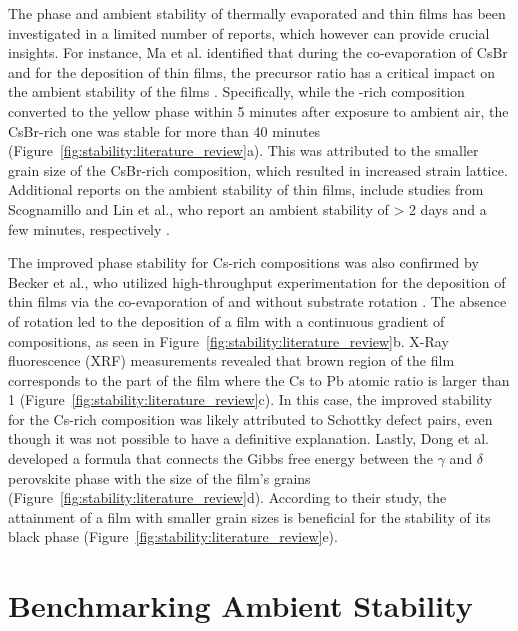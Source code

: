 The phase and ambient stability of thermally evaporated  and  thin films has been investigated in a limited number of reports, which however can provide crucial insights. For instance, Ma et al. identified that during the co-evaporation of CsBr and  for the deposition of  thin films, the precursor ratio has a critical impact on the ambient stability of the films \cite{Ma2017TheCells}. Specifically, while the -rich composition converted to the yellow phase within 5 minutes after exposure to ambient air, the CsBr-rich one was stable for more than 40 minutes (Figure~\ref{fig:stability:literature_review}a). This was attributed to the smaller grain size of the CsBr-rich composition, which resulted in increased strain lattice. Additional reports on the ambient stability of  thin films, include studies from Scognamillo and Lin et al., who report an ambient stability of > 2 days and a few minutes, respectively \cite{Scognamillo2019FullyCsPbI2Br, Lin2019EfficientDeposition}.

 The improved phase stability for Cs-rich compositions was also confirmed by Becker et al., who utilized high-throughput experimentation for the deposition of  thin films via the co-evaporation of  and  without substrate rotation \cite{Becker2019LowExperimentation}. The absence of rotation led to the deposition of a film with a continuous gradient of compositions, as seen in Figure~\ref{fig:stability:literature_review}b. X-Ray fluorescence (XRF) measurements revealed that brown region of the film corresponds to the part of the film where the Cs to Pb atomic ratio is larger than 1 (Figure~\ref{fig:stability:literature_review}c). In this case, the improved stability for the Cs-rich composition was likely attributed to Schottky defect pairs, even though it was not possible to have a definitive explanation. Lastly, Dong et al. developed a formula that connects the Gibbs free energy between the $\gamma$ and $\delta$ perovskite phase with the size of the film's grains (Figure~\ref{fig:stability:literature_review}d). According to their study, the attainment of a film with smaller grain sizes is beneficial for the stability of its black phase (Figure~\ref{fig:stability:literature_review}e).  

 

\section{Benchmarking Ambient Stability}

